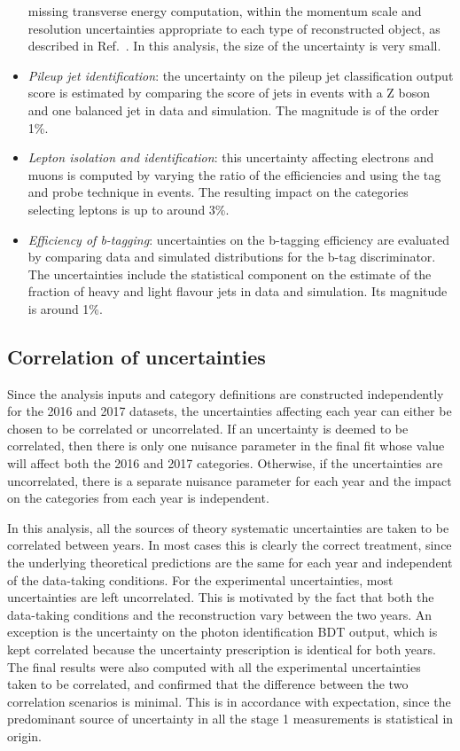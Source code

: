 \begin{itemize}
  missing transverse energy computation, 
  within the momentum scale and resolution uncertainties appropriate 
  to each type of reconstructed object,
  as described in Ref.~\cite{JetsInRun2}.
  In this analysis, the size of the uncertainty is very small.
\item \textit{Pileup jet identification}: 
  the uncertainty on the pileup jet classification output score is estimated by
  comparing the score of jets in events with a Z boson and one balanced jet
  in data and simulation. 
  The magnitude is of the order 1\%.
\item \textit{Lepton isolation and identification}: 
  this uncertainty affecting electrons and muons
  is computed by varying the ratio of the efficiencies and
  using the tag and probe technique in \Zee events. 
  The resulting impact on the categories selecting leptons is up to around 3\%.
\item \textit{Efficiency of b-tagging}: 
  uncertainties on the b-tagging efficiency are evaluated 
  by comparing data and simulated distributions for the b-tag
  discriminator.
  The uncertainties include the statistical component on the
  estimate of the fraction of heavy and
  light flavour jets in data and simulation.
  Its magnitude is around 1\%.
\end{itemize}

\subsection{Correlation of uncertainties}

Since the analysis inputs and category definitions are constructed independently 
for the 2016 and 2017 datasets, %
the uncertainties affecting each year can either be chosen to be correlated or uncorrelated.
If an uncertainty is deemed to be correlated, 
then there is only one nuisance parameter in the final fit 
whose value will affect both the 2016 and 2017 categories.
Otherwise, if the uncertainties are uncorrelated, there is a separate nuisance parameter for each year 
and the impact on the categories from each year is independent.

In this analysis, 
all the sources of theory systematic uncertainties are taken to be correlated between years.
In most cases this is clearly the correct treatment, %
since the underlying theoretical predictions are the same for each year 
and independent of the data-taking conditions.
For the experimental uncertainties,
most uncertainties are left uncorrelated.
This is motivated by the fact that both the data-taking conditions 
and the reconstruction vary between the two years.
An exception is the uncertainty on the photon identification BDT output, 
which is kept correlated because the uncertainty prescription is identical for both years.
The final results were also computed with all the experimental uncertainties taken to be correlated, 
and confirmed that the difference between the two correlation scenarios is minimal.
This is in accordance with expectation, since the predominant source of uncertainty 
in all the stage 1 measurements is statistical in origin.

